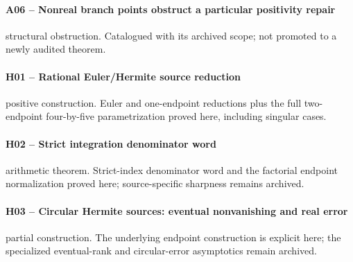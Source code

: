 \paragraph{A06 -- Nonreal branch points obstruct a particular positivity repair}\label{record-A06}
structural obstruction. Catalogued with its archived scope; not promoted to a newly audited theorem.
\par\smallskip{}\par
\paragraph{H01 -- Rational Euler/Hermite source reduction}\label{record-H01}
positive construction. Euler and one-endpoint reductions plus the full two-endpoint four-by-five parametrization proved here, including singular cases.
\par\smallskip{}\par
\paragraph{H02 -- Strict integration denominator word}\label{record-H02}
arithmetic theorem. Strict-index denominator word and the factorial endpoint normalization proved here; source-specific sharpness remains archived.
\par\smallskip{}\par
\paragraph{H03 -- Circular Hermite sources: eventual nonvanishing and real error}\label{record-H03}
partial construction. The underlying endpoint construction is explicit here; the specialized eventual-rank and circular-error asymptotics remain archived.
\par\smallskip{}\par
